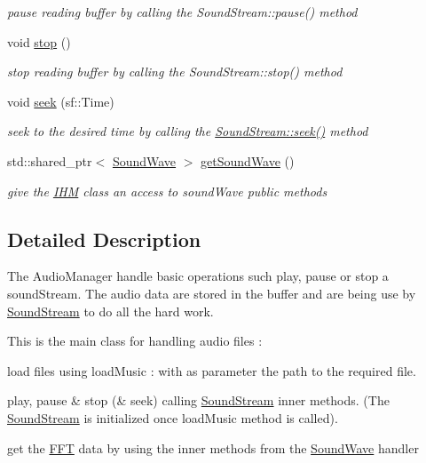 \begin{DoxyCompactItemize}
\begin{DoxyCompactList}\small\item\em pause reading buffer by calling the Sound\+Stream\+::pause() method \end{DoxyCompactList}\item 
void \hyperlink{classaudioManager_a24d4746810b66c3c5db3d041ce37ab36}{stop} ()\hypertarget{classaudioManager_a24d4746810b66c3c5db3d041ce37ab36}{}\label{classaudioManager_a24d4746810b66c3c5db3d041ce37ab36}

\begin{DoxyCompactList}\small\item\em stop reading buffer by calling the Sound\+Stream\+::stop() method \end{DoxyCompactList}\item 
void \hyperlink{classaudioManager_ae25f98a4737421d17abb94162495faf0}{seek} (sf\+::\+Time)\hypertarget{classaudioManager_ae25f98a4737421d17abb94162495faf0}{}\label{classaudioManager_ae25f98a4737421d17abb94162495faf0}

\begin{DoxyCompactList}\small\item\em seek to the desired time by calling the \hyperlink{classSoundStream_ae7d7a1c32e012792a9bba1df6e121e83}{Sound\+Stream\+::seek()} method \end{DoxyCompactList}\item 
std\+::shared\+\_\+ptr$<$ \hyperlink{classSoundWave}{Sound\+Wave} $>$ \hyperlink{classaudioManager_ac8d13904c755818858614b1242598e2b}{get\+Sound\+Wave} ()\hypertarget{classaudioManager_ac8d13904c755818858614b1242598e2b}{}\label{classaudioManager_ac8d13904c755818858614b1242598e2b}

\begin{DoxyCompactList}\small\item\em give the \hyperlink{classIHM}{I\+HM} class an access to sound\+Wave public methods \end{DoxyCompactList}\end{DoxyCompactItemize}


\subsection{Detailed Description}
The Audio\+Manager handle basic operations such play, pause or stop a sound\+Stream. The audio data are stored in the buffer and are being use by \hyperlink{classSoundStream}{Sound\+Stream} to do all the hard work. 

This is the main class for handling audio files \+:
\begin{DoxyItemize}
\item load files using load\+Music \+: with as parameter the path to the required file.
\item play, pause \& stop (\& seek) calling \hyperlink{classSoundStream}{Sound\+Stream} inner methods. (The \hyperlink{classSoundStream}{Sound\+Stream} is initialized once load\+Music method is called).
\item get the \hyperlink{classFFT}{F\+FT} data by using the inner methods from the \hyperlink{classSoundWave}{Sound\+Wave} handler 
\end{DoxyItemize}

